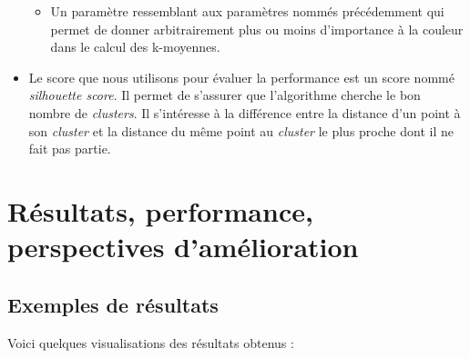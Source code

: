 \documentclass[titlepage,11pt,a4paper]{article}
\begin{document}
\begin{itemize}
{\begin{itemize}
\item{Un paramètre ressemblant aux paramètres nommés précédemment qui permet de donner arbitrairement plus ou moins d'importance à la couleur dans le calcul des k-moyennes.}
\end{itemize}}
\item{Le score que nous utilisons pour évaluer la performance est un score nommé \emph{silhouette score}. Il permet de s'assurer que l'algorithme cherche le bon nombre de \emph{clusters}. Il s'intéresse à la différence entre la distance d'un point à son \emph{cluster} et la distance du même point au \emph{cluster} le plus proche dont il ne fait pas partie.}
\end{itemize}

\newpage \section{Résultats, performance, perspectives d'amélioration}
\subsection{Exemples de résultats}
\par Voici quelques visualisations des résultats obtenus :
\end{document}
